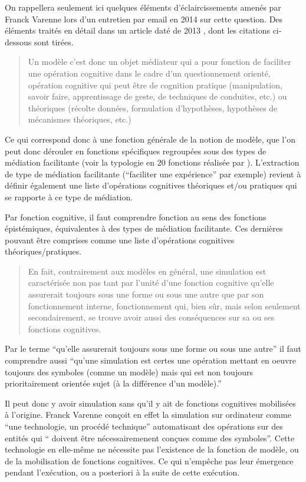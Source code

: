 On rappellera seulement ici quelques éléments d'éclaircissements amenés par Franck Varenne lors d'un entretien par email en 2014 sur cette question. Des éléments traités en détail dans un article daté de 2013 \autocite{Varenne2013b}, dont les citations ci-dessous sont tirées.

\blockquote[\cite{Varenne2013b}]{Un modèle c'est donc un objet médiateur qui a pour fonction de faciliter une opération cognitive dans le cadre d'un questionnement orienté, opération cognitive qui peut être de cognition pratique (manipulation, savoir­ faire, apprentissage de geste, de techniques de conduites, etc.) ou théoriques (récolte données, formulation d'hypothèses, hypothèses de mécanismes théoriques, etc.)}

Ce qui correspond donc à une fonction générale de la notion de modèle, que l'on peut donc dérouler en fonctions spécifiques regroupées sous des types de médiation facilitante (voir la typologie en 20 fonctions réalisée par \textcite{Varenne2013b}). L'extraction de type de médiation facilitante (\enquote{faciliter une expérience} par exemple) revient à définir également une liste d'opérations cognitives théoriques et/ou pratiques qui se rapporte à ce type de médiation.

Par fonction cognitive, il faut comprendre fonction au sens des fonctions épistémiques, équivalentes à des types de médiation facilitante. Ces dernières pouvant être comprises comme une liste d'opérations cognitives théoriques/pratiques.

\blockquote[\cite{Varenne2013b}]{En fait, contrairement aux modèles en général, une simulation est caractérisée non pas tant par l'unité d'une fonction cognitive qu'elle assurerait toujours sous une forme ou sous une autre que par son fonctionnement interne, fonctionnement qui, bien sûr, mais selon seulement secondairement, se trouve avoir aussi des conséquences sur sa ou ses fonctions cognitives.}

Par le terme \enquote{qu'elle assurerait toujours sous une forme ou sous une autre} il faut comprendre aussi \enquote{qu'une simulation est certes une opération mettant en oeuvre toujours des symboles (comme un modèle) mais qui est non toujours prioritairement orientée sujet (à la différence d'un modèle).}

Il peut donc y avoir simulation sans qu'il y ait de fonctions cognitives mobilisées à l'origine. Franck Varenne conçoit en effet la simulation sur ordinateur comme \enquote{une technologie, un procédé technique} automatisant des opérations sur des entités qui \enquote{ doivent être nécessairemenent conçues comme des symboles}. Cette technologie en elle-même ne nécessite pas l'existence de la fonction de modèle, ou de la mobilisation de fonctions cognitives. Ce qui n'empêche pas leur émergence pendant l'exécution, ou a posteriori à la suite de cette exécution.

